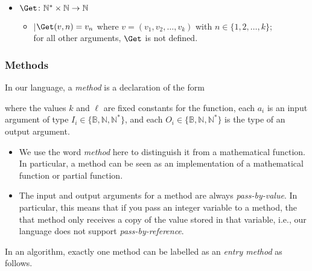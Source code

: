 \documentclass[11pt,a4paper,reqno]{amsart}
\makeatletter
\newcommand{\algorithmstyle}[1]{\renewcommand{\algocf@style}{#1}}
\newcommand{\commentLine}[1]{\tcp{\normalfont #1}}
\theoremstyle{plain}
\theoremstyle{definition}
\theoremstyle{definition}
\newenvironment{indentline}{\begin{itemize}[leftmargin=1em]\item[]}{\end{itemize}}
\makeatother
\begin{document}
\begin{itemize}[leftmargin=2em]
\begin{indentline}
		      \smallskip
		      \noindent
		      $\Get\colon \mathbb N^* \times \mathbb N \to \mathbb N$
		      \begin{indentline}
			      $\mid$\quad $\Get(v,n) = v_n$ where $v = (v_1,v_2,\ldots,v_k)$ with $n\in\{1,2,\ldots,k\}$;\\
			      \phantom{$\mid$\quad }for all other arguments, $\Get$ is not defined.
		      \end{indentline}
	      \end{indentline}
\end{itemize}

\subsubsection{Methods}
\algorithmstyle{plainruled}


In our language, a \emph{method} is a declaration of the form

\begin{algorithm}[H]
	 {
		\commentLine{method content goes here}
	}
\end{algorithm}

\noindent
where the values $k$ and $\ell$ are fixed constants for the function, each $a_i$ is an input argument of type $I_i \in \{\mathbb B, \mathbb N, \mathbb N^*\}$, and each $O_i \in \{\mathbb B, \mathbb N, \mathbb N^*\}$ is the type of an output argument.

\begin{itemize}[leftmargin=2em]
	\item
	      We use the word \emph{method} here to distinguish it from a mathematical function.
	      In particular, a method can be seen as an implementation of a mathematical function or partial function.

	\item
	      The input and output arguments for a method are always \textit{pass-by-value}.
	      In particular, this means that if you pass an integer variable to a method, the that method only receives a copy of the value stored in that variable, i.e., our language does not support \textit{pass-by-reference}.
\end{itemize}

\noindent
In an algorithm, exactly one method can be labelled as an \emph{entry method} as follows.
\end{document}
